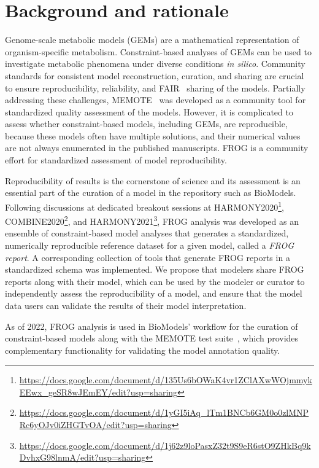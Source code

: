 \chapter{Background and rationale}

Genome-scale metabolic models (GEMs) are a mathematical representation of organism-specific metabolism.
Constraint-based analyses of GEMs can be used to investigate metabolic phenomena under diverse conditions \textit{in silico}.
Community standards for consistent model reconstruction, curation, and sharing are crucial to ensure reproducibility, reliability, and FAIR~\cite{stall2019make} sharing of the models.
Partially addressing these challenges, MEMOTE~\cite{lieven2020memote} was developed as a community tool for standardized quality assessment of the models.
However, it is complicated to assess whether constraint-based models, including GEMs, are reproducible, because these models often have multiple solutions, and their numerical values are not always enumerated in the published manuscripts.
FROG is a community effort for standardized assessment of model reproducibility.

Reproducibility of results is the cornerstone of science and its assessment is an essential part of the curation of a model in the repository such as BioModels.
Following discussions at dedicated breakout sessions at HARMONY2020\footnote{\url{https://docs.google.com/document/d/135Us6bOWaK4vr1ZClAXwWOjmmykEEwx_geSR8wJEmEY/edit?usp=sharing}}, COMBINE2020\footnote{\url{https://docs.google.com/document/d/1yGI5iAq_lTm1BNCb6GM0o0zlMNPRc6yOJv0iZHGTvOA/edit?usp=sharing}}, and HARMONY2021\footnote{\url{https://docs.google.com/document/d/1j62z9loPasxZ32t9S9eR6stO9ZHkBq9kDvhxG98lnmA/edit?usp=sharing}}, FROG analysis was developed as an ensemble of constraint-based model analyses that generates a standardized, numerically reproducible reference dataset for a given model, called a \emph{FROG report}.
A corresponding collection of tools that generate FROG reports in a standardized schema was implemented.
We propose that modelers share FROG reports along with their model, which can be used by the modeler or curator to independently assess the reproducibility of a model, and ensure that the model data users can validate the results of their model interpretation.

As of 2022, FROG analysis is  used in BioModels' workflow for the curation of constraint-based models along with the MEMOTE test suite~\cite{lieven2020memote}, which provides complementary functionality for validating the model annotation quality.

